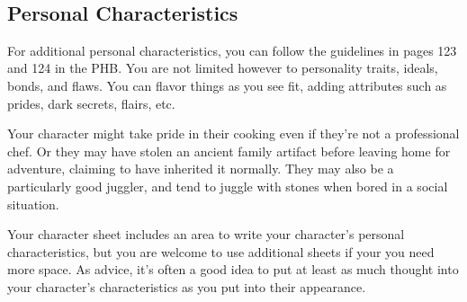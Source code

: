 \pagebreak~
\vspace{7cm}

\subsection*{Personal Characteristics}
    For additional personal characteristics, you can follow the guidelines in pages 123 and 124 in the PHB.
    You are not limited however to personality traits, ideals, bonds, and flaws.
    You can flavor things as you see fit, adding attributes such as prides, dark secrets, flairs, etc.

    Your character might take pride in their cooking even if they're not a professional chef.
    Or they may have stolen an ancient family artifact before leaving home for adventure, claiming to have inherited it normally.
    They may also be a particularly good juggler, and tend to juggle with stones when bored in a social situation.

    Your character sheet includes an area to write your character's personal characteristics, but you are welcome to use additional sheets if your you need more space.
    As advice, it's often a good idea to put at least as much thought into your character's characteristics as you put into their appearance.
